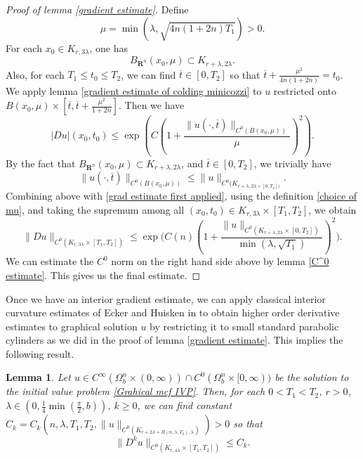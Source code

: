 \documentclass[pdflatex,sn-mathphys-num]{sn-jnl}%
\newtheorem{lemma}[theorem]{Lemma}
\begin{document}
\begin{proof}[Proof of lemma \ref{gradient estimate}]
Define 
\begin{equation}\label{choice of mu}
        \mu = \min(\lambda, \sqrt{4n(1 + 2n)T_1}) > 0.
    \end{equation}
    For each $x_0 \in K_{r, 3\lambda}$,
    one has
    \begin{equation}
         B_{\mathbf{R}^n}(x_0, \mu) \subset K_{r + \lambda, 2\lambda}.
    \end{equation} Also, for each $T_1 \leq t_0 \leq T_2$, we can find $\overline{t} \in [0, T_2]$ so that $\overline{t} + \frac{\mu^2}{4n(1 + 2n)} = t_0$.  
   We apply lemma \ref{gradient estimate of colding minicozzi} to $u$ restricted onto $B(x_0, \mu) \times [\overline{t}, \overline{t} + \frac{\mu^2}{1 + 2n}]$. Then we have
    \begin{equation}\label{grad estimate first applied}
        |Du|(x_0, t_0) \leq \exp(C(1 + \frac{\|u(\cdot, \overline{t})\|_{C^0(B(x_0, \mu))}}{\mu})^2).
    \end{equation}
    By the fact that $ B_{\mathbf{R}^n}(x_0, \mu) \subset K_{r + \lambda, 2\lambda}$, and $\overline{t} \in [0, T_2]$, we trivially have
    \begin{equation}
        \|u(\cdot, \overline{t})\|_{C^0(B(x_0, \mu))} \leq \|u\|_{C^0(K_{r + \lambda, 2\lambda \times [0, T_2])}}.
    \end{equation}
    Combining above with \eqref{grad estimate first applied}, using the definition \eqref{choice of mu}, and taking the supremum among all $(x_0, t_0) \in K_{r, 3\lambda} \times [T_1, T_2]$, we obtain
    \begin{equation}
        \|Du\|_{C^0(K_{r, 3\lambda} \times [T_1, T_2])} \leq \exp{(C(n)(1 + \frac{\|u\|_{C^0(K_{r + \lambda, 2\lambda}\times [0, T_2])}}{\min(\lambda, \sqrt{T_1})})^2}).
    \end{equation}
We can estimate the $C^0$ norm on the right hand side above by lemma \ref{C^0 estimate}. This gives us the final estimate.
\end{proof}
Once we have an interior gradient estimate, we can apply classical interior curvature estimates of Ecker and Huisken in \cite{eckerhuisken} to obtain higher order derivative estimates to graphical solution $u$ by restricting it to small standard parabolic cylinders as we did in the proof of lemma \ref{gradient estimate}. This implies the following result. 
\begin{lemma}\label{higher order derivative estimate}
    Let $u \in C^{\infty}(\Omega^n_b \times (0, \infty)) \cap C^0(\Omega^n_b \times [0, \infty))$ be the solution to the initial value problem \eqref{Grahical mcf IVP}. Then, for each $0 < T_1 < T_2$, $r > 0$, $\lambda \in (0,\frac{1}{4}\min(\frac{\pi}{2},b))$, $k \geq 0$, we can find constant $C_k = C_k(n, \lambda, T_1, T_2, \|u\|_{C^0(K_{r+ 2\lambda + R(n, \lambda, T_2), \lambda})}) > 0$ so that
    \begin{equation}
        \|D^ku\|_{C^0(K_{r, 4\lambda} \times [T_1, T_2])} \leq C_k.
    \end{equation}
\end{lemma}
\end{document}
